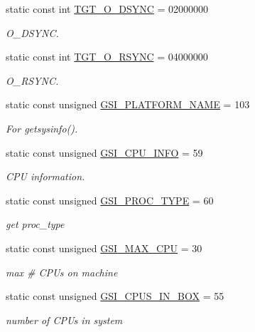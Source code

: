 \begin{Indent}{\bf }
\begin{DoxyCompactItemize}
static const int \hyperlink{classAlphaLinux_ac8d84ac6abb2d868443e4559bed55ebe}{TGT\_\-O\_\-DSYNC} = 02000000
\begin{DoxyCompactList}\small\item\em O\_\-DSYNC. \item\end{DoxyCompactList}\item 
static const int \hyperlink{classAlphaLinux_a1b4245158ffbfdc36ae7d6e666ffc261}{TGT\_\-O\_\-RSYNC} = 04000000
\begin{DoxyCompactList}\small\item\em O\_\-RSYNC. \item\end{DoxyCompactList}\item 
static const unsigned \hyperlink{classAlphaLinux_ac2412600f242b3062b887ef0ec4b4908}{GSI\_\-PLATFORM\_\-NAME} = 103
\begin{DoxyCompactList}\small\item\em For getsysinfo(). \item\end{DoxyCompactList}\item 
static const unsigned \hyperlink{classAlphaLinux_ad89f91e0925845385f177d93e4ef7985}{GSI\_\-CPU\_\-INFO} = 59
\begin{DoxyCompactList}\small\item\em CPU information. \item\end{DoxyCompactList}\item 
static const unsigned \hyperlink{classAlphaLinux_a3048b7c97d8a7e86854cdb73520560d0}{GSI\_\-PROC\_\-TYPE} = 60
\begin{DoxyCompactList}\small\item\em get proc\_\-type \item\end{DoxyCompactList}\item 
static const unsigned \hyperlink{classAlphaLinux_a14ed8f49156face38fb0dee35125148d}{GSI\_\-MAX\_\-CPU} = 30
\begin{DoxyCompactList}\small\item\em max \# CPUs on machine \item\end{DoxyCompactList}\item 
static const unsigned \hyperlink{classAlphaLinux_a4df912c77419619f6f242873f65b0045}{GSI\_\-CPUS\_\-IN\_\-BOX} = 55
\begin{DoxyCompactList}\small\item\em number of CPUs in system \item\end{DoxyCompactList}\item 

\end{DoxyCompactItemize}
\end{Indent}
